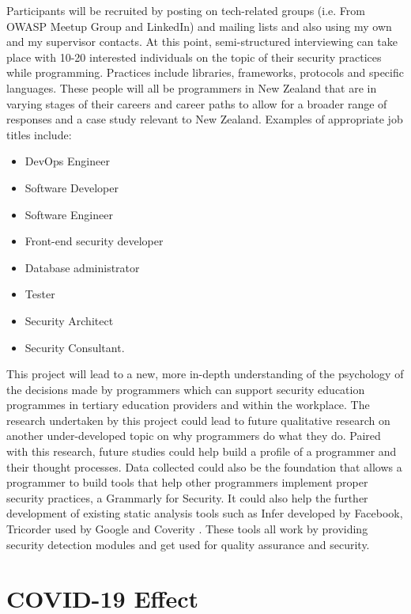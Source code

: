 \newline
\par Participants will be recruited by posting on tech-related groups (i.e. From OWASP Meetup Group and LinkedIn) and mailing lists and also using my own and my supervisor contacts. At this point, semi-structured interviewing can take place with 10-20 interested individuals on the topic of their security practices while programming. Practices include libraries, frameworks, protocols and specific languages. These people will all be programmers in New Zealand that are in varying stages of their careers and career paths to allow for a broader range of responses and a case study relevant to New Zealand. Examples of appropriate job titles include:
\begin{itemize}
\item  DevOps Engineer
\item Software Developer
\item Software Engineer
\item Front-end security developer
\item Database administrator
\item Tester
\item Security Architect
\item Security Consultant.
\end{itemize}

\par This project will lead to a new, more in-depth understanding of the psychology of the decisions made by programmers which can support security education programmes in tertiary education providers and within the workplace. The research undertaken by this project could lead to future qualitative research on another under-developed topic on why programmers do what they do. Paired with this research, future studies could help build a profile of a programmer and their thought processes. Data collected could also be the foundation that allows a programmer to build tools that help other programmers implement proper security practices, a Grammarly for Security. It could also help the further development of existing static analysis tools such as Infer developed by Facebook, Tricorder used by Google and Coverity \cite{infer, tri, coverity}. These tools all work by providing security detection modules and get used for quality assurance and security. 

\section{COVID-19 Effect}

